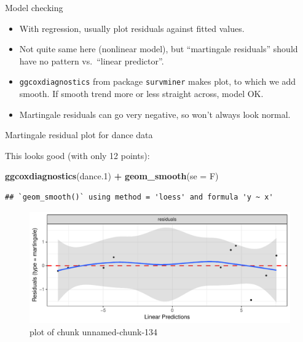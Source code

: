 \documentclass[ignorenonframetext,]{beamer}
\newenvironment{Shaded}{\begin{snugshade}}{\end{snugshade}}
\newcommand{\DataTypeTok}[1]{\textcolor[rgb]{0.13,0.29,0.53}{#1}}
\newcommand{\FloatTok}[1]{\textcolor[rgb]{0.00,0.00,0.81}{#1}}
\newcommand{\KeywordTok}[1]{\textcolor[rgb]{0.13,0.29,0.53}{\textbf{#1}}}
\newcommand{\NormalTok}[1]{#1}
\newcommand{\OperatorTok}[1]{\textcolor[rgb]{0.81,0.36,0.00}{\textbf{#1}}}
\newcommand{\StringTok}[1]{\textcolor[rgb]{0.31,0.60,0.02}{#1}}
\begin{document}
\begin{frame}[fragile]{Model checking}
\protect\hypertarget{model-checking}{}

\begin{itemize}
\item
  With regression, usually plot residuals against fitted values.
\item
  Not quite same here (nonlinear model), but ``martingale residuals''
  should have no pattern vs.~``linear predictor''.
\item
  \texttt{ggcoxdiagnostics} from package \texttt{survminer} makes plot,
  to which we add smooth. If smooth trend more or less straight across,
  model OK.
\item
  Martingale residuals can go very negative, so won't always look
  normal.
\end{itemize}

\end{frame}

\begin{frame}[fragile]{Martingale residual plot for dance data}
\protect\hypertarget{martingale-residual-plot-for-dance-data}{}

This looks good (with only 12 points):

\begin{Shaded}
\begin{Highlighting}[]
\KeywordTok{ggcoxdiagnostics}\NormalTok{(dance}\FloatTok{.1}\NormalTok{) }\OperatorTok{+}\StringTok{ }\KeywordTok{geom_smooth}\NormalTok{(}\DataTypeTok{se =}\NormalTok{ F)}
\end{Highlighting}
\end{Shaded}

\begin{verbatim}
## `geom_smooth()` using method = 'loess' and formula 'y ~ x'
\end{verbatim}

\begin{figure}
\centering
\includegraphics{figure/unnamed-chunk-134-1.pdf}
\caption{plot of chunk unnamed-chunk-134}
\end{figure}

\end{frame}
\end{document}
